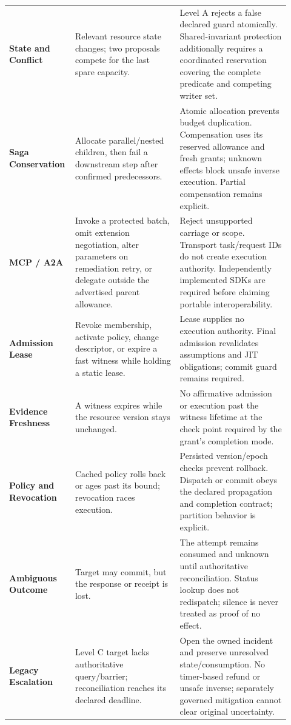 \begin{longtable}{L{0.18\linewidth}L{0.36\linewidth}L{0.38\linewidth}}
\textbf{State and Conflict} & Relevant resource state changes; two proposals compete for the last spare capacity. & Level A rejects a false declared guard atomically. Shared-invariant protection additionally requires a coordinated reservation covering the complete predicate and competing writer set.\\
\textbf{Saga Conservation} & Allocate parallel/nested children, then fail a downstream step after confirmed predecessors. & Atomic allocation prevents budget duplication. Compensation uses its reserved allowance and fresh grants; unknown effects block unsafe inverse execution. Partial compensation remains explicit.\\
\textbf{MCP / A2A} & Invoke a protected batch, omit extension negotiation, alter parameters on remediation retry, or delegate outside the advertised parent allowance. & Reject unsupported carriage or scope. Transport task/request IDs do not create execution authority. Independently implemented SDKs are required before claiming portable interoperability.\\
\textbf{Admission Lease} & Revoke membership, activate policy, change descriptor, or expire a fast witness while holding a static lease. & Lease supplies no execution authority. Final admission revalidates assumptions and JIT obligations; commit guard remains required.\\
\textbf{Evidence Freshness} & A witness expires while the resource version stays unchanged. & No affirmative admission or execution past the witness lifetime at the check point required by the grant's completion mode.\\
\textbf{Policy and Revocation} & Cached policy rolls back or ages past its bound; revocation races execution. & Persisted version/epoch checks prevent rollback. Dispatch or commit obeys the declared propagation and completion contract; partition behavior is explicit.\\
\textbf{Ambiguous Outcome} & Target may commit, but the response or receipt is lost. & The attempt remains consumed and unknown until authoritative reconciliation. Status lookup does not redispatch; silence is never treated as proof of no effect.\\
\textbf{Legacy Escalation} & Level C target lacks authoritative query/barrier; reconciliation reaches its declared deadline. & Open the owned incident and preserve unresolved state/consumption. No timer-based refund or unsafe inverse; separately governed mitigation cannot clear original uncertainty.\\

\end{longtable}
